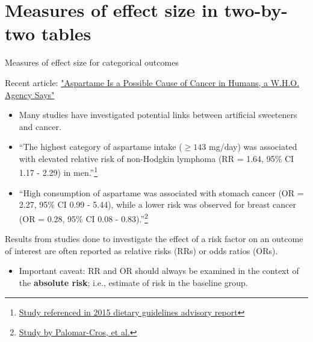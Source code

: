 \documentclass[
  ignorenonframetext,
  aspectratio=169]{beamer}
\providecommand{\tightlist}{%
  \setlength{\itemsep}{0pt}\setlength{\parskip}{0pt}}
\begin{document}
\hypertarget{measures-of-effect-size-in-two-by-two-tables}{%
\section{Measures of effect size in two-by-two
tables}\label{measures-of-effect-size-in-two-by-two-tables}}

\begin{frame}{Measures of effect size for categorical outcomes}
\protect\hypertarget{measures-of-effect-size-for-categorical-outcomes}{}
\small

Recent article:
\textcolor{blue}{\href{https://www.nytimes.com/2023/07/13/health/aspartame-cancer-who-sweetener.html}{"Aspartame Is a Possible Cause of Cancer in Humans, a W.H.O. Agency Says"}}

\footnotesize

\begin{itemize}
\item
  Many studies have investigated potential links between artificial
  sweeteners and cancer.
\item
  ``The highest category of aspartame intake (\(\geq 143\) mg/day) was
  associated with elevated relative risk of non-Hodgkin lymphoma (RR =
  1.64, 95\% CI 1.17 - 2.29) in
  men.''\footnote{\href{https://health.gov/our-work/nutrition-physical-activity/dietary-guidelines/previous-dietary-guidelines/2015/advisory-report/appendix-e-2/appendix-e-241}{Study referenced in 2015 dietary guidelines advisory report}}
\item
  ``High consumption of aspartame was associated with stomach cancer (OR
  = 2.27, 95\% CI 0.99 - 5.44), while a lower risk was observed for
  breast cancer (OR = 0.28, 95\% CI 0.08 -
  0.83).''\footnote{\href{https://onlinelibrary.wiley.com/doi/10.1002/ijc.34577}{Study by Palomar-Cros, et al.}}
\end{itemize}

\small

Results from studies done to investigate the effect of a risk factor on
an outcome of interest are often reported as relative risks (RRs) or
odds ratios (ORs).

\begin{itemize}
\tightlist
\item
  Important caveat: RR and OR should always be examined in the context
  of the \textbf{absolute risk}; i.e., estimate of risk in the baseline
  group.
\end{itemize}
\end{frame}
\end{document}
